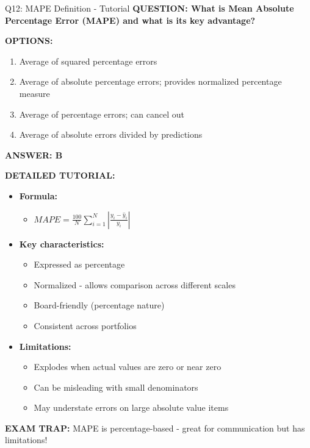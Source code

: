 \documentclass[8pt]{beamer}
\begin{document}
	\begin{frame}{Q12: MAPE Definition - Tutorial}
		\fontsize{6.5}{7.5}\selectfont
		\textbf{QUESTION: What is Mean Absolute Percentage Error (MAPE) and what is its key advantage?}
		
		\vspace{0.1cm}
		\textbf{OPTIONS:}
		\begin{enumerate}
			\item Average of squared percentage errors
			\item Average of absolute percentage errors; provides normalized percentage measure
			\item Average of percentage errors; can cancel out
			\item Average of absolute errors divided by predictions
		\end{enumerate}
		
		\vspace{0.1cm}
		\textcolor{myblue}{\textbf{ANSWER: B}}
		
		\vspace{0.1cm}
		\textbf{DETAILED TUTORIAL:}
		\begin{itemize}
			\item \textbf{Formula:}
			\begin{itemize}
				\item $MAPE = \frac{100}{N}\sum_{i=1}^N \left|\frac{y_i - \hat{y}_i}{y_i}\right|$
			\end{itemize}
			\item \textbf{Key characteristics:}
			\begin{itemize}
				\item Expressed as percentage
				\item Normalized - allows comparison across different scales
				\item Board-friendly (percentage nature)
				\item Consistent across portfolios
			\end{itemize}
			\item \textbf{Limitations:}
			\begin{itemize}
				\item Explodes when actual values are zero or near zero
				\item Can be misleading with small denominators
				\item May understate errors on large absolute value items
			\end{itemize}
		\end{itemize}
		
		\textcolor{myred}{\textbf{EXAM TRAP:}} MAPE is \textcolor{myblue}{percentage-based} - great for communication but has limitations!
	\end{frame}
	
\end{document}
